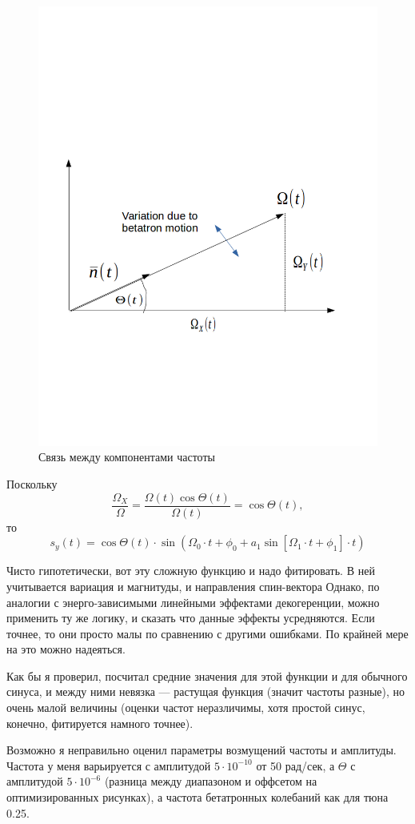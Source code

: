 \documentclass{article}     %
\newcommand{\W}{\Omega}
\begin{document}
\begin{figure}[h]
  \centering
  \includegraphics[width=\linewidth, trim=1 200 1 270, clip]{../img/IPAC19/omega_plot}
  \caption{Связь между компонентами частоты\label{fig:omega_plot}}
\end{figure}

Поскольку
\[
\frac{\W_X}{\W} = \frac{\W(t)\cos\Theta(t)}{\W(t)} = \cos\Theta(t),
\]
то
\[
s_y(t) = \cos\Theta(t)\cdot \sin\left(\W_0\cdot t + \phi_0 + a_1\sin\left[\W_1\cdot t + \phi_1\right]\cdot t\right)
\]

Чисто гипотетически, вот эту сложную функцию и надо фитировать. В ней учитывается вариация и магнитуды,
и направления спин-вектора Однако, по аналогии с энерго-зависимыми линейными эффектами декогеренции, можно
применить ту же логику, и сказать что данные эффекты усредняются. Если точнее, то они просто малы по сравнению
с другими ошибками. По крайней мере на это можно надеяться.

Как бы я проверил, посчитал средние значения для этой функции и для обычного синуса, и между ними невязка ---
растущая функция (значит частоты разные), но очень малой величины (оценки частот неразличимы, хотя простой
синус, конечно, фитируется намного точнее).

Возможно я неправильно оценил параметры возмущений частоты и амплитуды. Частота у меня варьируется с амплитудой
$5\cdot 10^{-10}$ от 50 рад/сек, а $\Theta$ с амплитудой $5\cdot 10^{-6}$ (разница между диапазоном
и оффсетом на оптимизированных рисунках), а частота бетатронных колебаний как для тюна 0.25.
 
\end{document}
